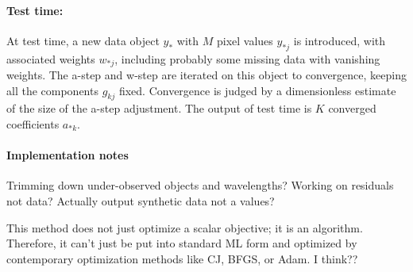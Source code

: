 \documentclass{article}
\begin{document}
\paragraph{Test time:}
At test time, a new data object $y_\ast$ with $M$ pixel values $y_{\ast j}$ is introduced, with associated weights $w_{\ast j}$, including probably some missing data with vanishing weights.
The a-step and w-step are iterated on this object to convergence, keeping all the components $g_{kj}$ fixed.
Convergence is judged by a dimensionless estimate of the size of the a-step adjustment.
The output of test time is $K$ converged coefficients $a_{\ast k}$.

\paragraph{Implementation notes}
Trimming down under-observed objects and wavelengths?
Working on residuals not data?
Actually output synthetic data not a values?

This method does not just optimize a scalar objective; it is an algorithm.
Therefore, it can't just be put into standard ML form and optimized by contemporary optimization methods like CJ, BFGS, or Adam.
I think??

\raggedright\footnotesize


\end{document}
